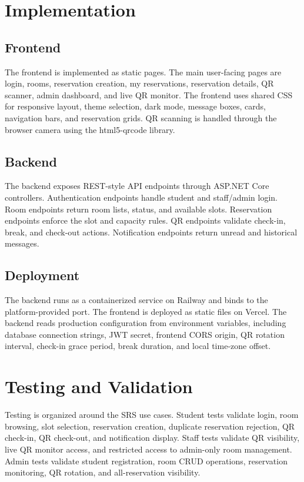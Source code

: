 \documentclass[conference]{IEEEtran}
\begin{document}
\section{Implementation}
\subsection{Frontend}
The frontend is implemented as static pages. The main user-facing pages are
login, rooms, reservation creation, my reservations, reservation details, QR
scanner, admin dashboard, and live QR monitor. The frontend uses shared CSS for
responsive layout, theme selection, dark mode, message boxes, cards, navigation
bars, and reservation grids. QR scanning is handled through the browser camera
using the html5-qrcode library.

\subsection{Backend}
The backend exposes REST-style API endpoints through ASP.NET Core controllers.
Authentication endpoints handle student and staff/admin login. Room endpoints
return room lists, status, and available slots. Reservation endpoints enforce
the slot and capacity rules. QR endpoints validate check-in, break, and
check-out actions. Notification endpoints return unread and historical
messages.

\subsection{Deployment}
The backend runs as a containerized service on Railway and binds to the
platform-provided port. The frontend is deployed as static files on Vercel.
The backend reads production configuration from environment variables,
including database connection strings, JWT secret, frontend CORS origin, QR
rotation interval, check-in grace period, break duration, and local time-zone
offset.

\section{Testing and Validation}
Testing is organized around the SRS use cases. Student tests validate login,
room browsing, slot selection, reservation creation, duplicate reservation
rejection, QR check-in, QR check-out, and notification display. Staff tests
validate QR visibility, live QR monitor access, and restricted access to
admin-only room management. Admin tests validate student registration, room
CRUD operations, reservation monitoring, QR rotation, and all-reservation
visibility.
\end{document}
